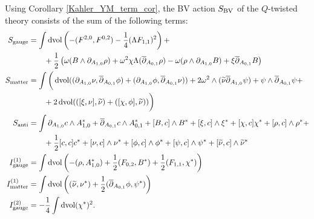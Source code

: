 \documentclass[10pt, oneside]{article}
\newcommand{\gauge}{\mathrm{gauge}}
\newcommand{\matter}{\mathrm{matter}}
\begin{document}
Using Corollary \ref{Kahler_YM_term_cor}, the BV action $S_{\mathrm{BV}}$ of the $Q$-twisted theory consists of the sum of the following terms:
\begin{align*}
S_{\gauge} &= \int \dvol \left(-(F^{2, 0}, F^{0, 2}) - \frac{1}{4}(\Lambda F_{1, 1})^2\right) + \\
&\qquad + \frac 12 \left( \omega(B \wedge \dd_{A_{1,0}} \rho) + \omega^2\chi\Lambda(\ol \dd_{A_{0,1}} \rho) - \omega(\rho \wedge \dd_{A_{1,0}} B) + \xi \ol \dd_{A_{0,1}} B \right)  \\
S_{\matter} &= \int \bigg( \dvol ((\dd_{A_{1,0}}\nu, \ol \dd_{A_{0,1}} \phi) + (\dd_{A_{1,0}}\phi, \ol \dd_{A_{0,1}} \nu)) + 2\omega^2\wedge(\wt\nu \ol \dd_{A_{1,0}} \psi) + \psi \wedge \ol \dd_{A_{0,1}} \psi + \\
&\qquad + 2\dvol(([\xi,\nu],\wt\nu) + ([\chi, \phi], \wt\nu) )   \bigg) \\
S_{\mr{anti}} &= \int \dd_{A_{1, 0}} c \wedge A_{1, 0}^* + \ol\dd_{A_{0, 1}} c\wedge A_{0, 1}^* + [B, c]\wedge B^* +  [\xi, c]\wedge \xi^* + [\chi, c]\chi^* +[\rho, c]\wedge \rho^* + \\
&\qquad + \frac{1}{2}[c, c]c^* + [\nu, c]\wedge \nu^* + [\phi, c]\wedge \phi^* + [\psi, c]\wedge \psi^* + [\wt\nu, c]\wedge \wt\nu^* \\
I^{(1)}_{\gauge} &=  \int \dvol \left( - (\rho, A_{1,0}^*) + \frac 12 (F_{0,2},B^*) + \frac 12 (F_{1,1}, \chi^*)  \right)\\
I^{(1)}_{\matter} &=  \int \dvol \left( (\wt\nu, \nu^*) + \frac 12( \ol \dd_{A_{0,1}} \phi, \psi^*) \right)\\
I^{(2)}_{\gauge} &= -\frac{1}{4}\int \dvol (\chi^*)^2.
\end{align*}
\end{document}
